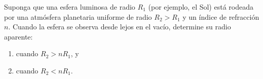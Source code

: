 \item Suponga que una esfera luminosa de radio $R_1$ (por ejemplo, el Sol) está rodeada por una atmósfera planetaria uniforme de radio $R_2 > R_1$ y un índice de refracción $n$. Cuando la esfera se observa desde lejos en el vacío, determine su radio aparente:
\begin{enumerate}
    \item cuando $R_2 > n R_1$, y
    \item cuando $R_2 < n R_1$.
\end{enumerate}